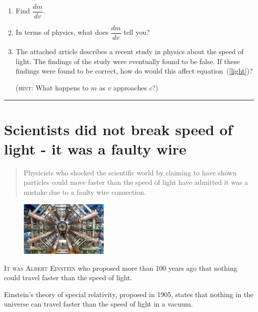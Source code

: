 \documentclass[11pt]{article}
\begin{document}
\begin{enumerate}
\begin{enumerate}
\item Find $\dfrac{dm}{dv}$.
\vfill
\item In terms of physics, what does $\dfrac{dm}{dv}$ tell you?
\vfill

\newpage


\item The attached article describes a recent study in physics about
  the speed of light.  The findings of the study were eventually found
  to be false.  If these findings were found to be correct, how do
  would this affect equation~(\ref{light})?

  (\textsc{hint}: What happens to $m$ as $v$ approaches $c$?)

  \vspace{3.9in}
\end{enumerate}

\end{enumerate}

\hrule

\section*{Scientists did not break speed of light - it was a faulty wire}

\begin{abstract}
  \noindent Physicists who shocked the scientific world by claiming to
  have shown particles could move faster than the speed of light have
  admitted it was a mistake due to a faulty wire connection.
\end{abstract}

\begin{figure}
  \begin{center}
    \includegraphics[width=0.38\textwidth]{cern.jpg}
  \end{center}
\end{figure}

\lettrine[lines=1]{I}{t was Albert Einstein} who proposed more than 100 years ago that
nothing could travel faster than the speed of light. 

Einstein’s theory of special relativity, proposed in 1905, states that
nothing in the universe can travel faster than the speed of light in a
vacuum.
\end{document}
